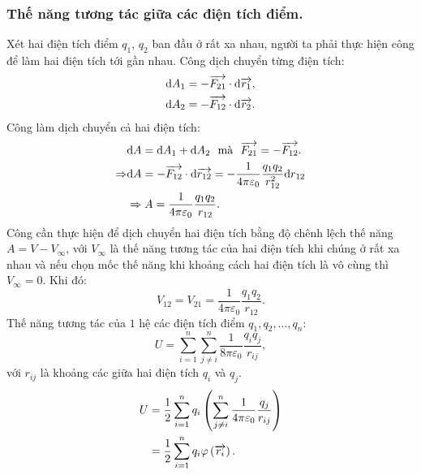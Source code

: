 \begin{appendices}
\subsubsection{Thế năng tương tác giữa các điện tích điểm.}
    Xét hai điện tích điểm $q_1$, $q_2$ ban đầu ở rất xa nhau, người ta phải thực hiện công để làm hai điện tích tới gần nhau. Công dịch chuyển từng điện tích:
    \begin{align*}
        \mathrm{d} A_1=-\overrightarrow{{F}_{21}}\cdot \mathrm{d}\overrightarrow{{r}_1},\\
        \mathrm{d} A_2=-\overrightarrow{{F}_{12}}\cdot \mathrm{d}\overrightarrow{{r}_2}.
    \end{align*}
    Công làm dịch chuyển cả hai điện tích:
    \begin{align*}
        &\mathrm{d} A=\mathrm{d} A_1+\mathrm{d} A_2 \ \text{ mà } \  \overrightarrow{{F}_{21}}=-\overrightarrow{{F}_{12}}.\\
        \Rightarrow &\mathrm{d} A=-\overrightarrow{{F}_{12}}\cdot \mathrm{d}\overrightarrow{{r}_{12}}=-\dfrac{1}{4\pi \varepsilon_0}\dfrac{q_1q_2}{r_{12}^2}\mathrm{d} r_{12}\\&\Rightarrow A=\dfrac{1}{4\pi \varepsilon_0}\dfrac{q_1q_2}{r_{12}}.
        \end{align*}
    Công cần thực hiện để dịch chuyển hai điện tích bằng độ chênh lệch thế năng        $A=V-V_\infty$, với $V_\infty$ là thế năng tương tác của hai điện tích khi chúng ở rất xa nhau và nếu chọn mốc thế năng khi khoảng cách hai điện tích là vô cùng thì $V_\infty=0$. Khi đó:\\
    $$V_{12}=V_{21}=\dfrac{1}{4\pi\varepsilon_0}\dfrac{q_1q_2}{r_{12}}.$$
    Thế năng tương tác của $1$ hệ các điện tích điểm $q_1,q_2,...,q_n$:\\
    $$U=\sum_{i =1}^{n}\sum_{j\ne i}^{n}\dfrac{1}{8\pi \varepsilon_0}\dfrac{q_iq_j}{r_{ij}},$$
    với $r_{ij}$ là khoảng các giữa hai điện tích $q_i$ và $q_j$.
    \begin{align*}
        U&=\dfrac{1}{2}\sum_{i =1}^{n}q_i\left(\sum_{j\ne i}^{n}\dfrac{1}{4\pi \varepsilon_0}\dfrac{q_j}{r_{ij}}\right)\\
        &=\dfrac{1}{2}\sum_{i =1}^{n}q_i\varphi\left(\overrightarrow{r_i}\right).
    \end{align*}

\end{appendices}
